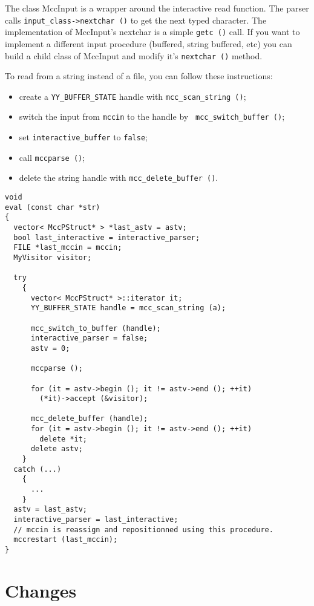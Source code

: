 \documentclass[11pt]{article}
\begin{document}
The class MccInput is a wrapper around the interactive read function.  The
parser calls {\tt input\_class->nextchar ()} to get the next typed
character.  The implementation of MccInput's nextchar is a simple {\tt getc
  ()} call.  If you want to implement a different input procedure (buffered,
string buffered, etc) you can build a child class of MccInput and modify
it's {\tt nextchar ()} method.

To read from a string instead of a file, you can follow these instructions:
\begin{itemize}
\item create a {\tt YY\_BUFFER\_STATE} handle with {\tt mcc\_scan\_string
    ()};
\item switch the input from {\tt mccin} to the handle by {\tt
    mcc\_switch\_buffer ()};
\item set {\tt interactive\_buffer} to {\tt false};
\item call {\tt mccparse ()};
\item delete the string handle with {\tt mcc\_delete\_buffer ()}.
\end{itemize}

\begin{verbatim}
void
eval (const char *str)
{
  vector< MccPStruct* > *last_astv = astv;
  bool last_interactive = interactive_parser;
  FILE *last_mccin = mccin;
  MyVisitor visitor;

  try
    {
      vector< MccPStruct* >::iterator it;
      YY_BUFFER_STATE handle = mcc_scan_string (a);
      
      mcc_switch_to_buffer (handle);
      interactive_parser = false;
      astv = 0;

      mccparse ();
      
      for (it = astv->begin (); it != astv->end (); ++it)
        (*it)->accept (&visitor);

      mcc_delete_buffer (handle);
      for (it = astv->begin (); it != astv->end (); ++it)
        delete *it;
      delete astv;
    }
  catch (...)
    {
      ...
    }
  astv = last_astv;
  interactive_parser = last_interactive;
  // mccin is reassign and repositionned using this procedure.
  mccrestart (last_mccin);
}
\end{verbatim}


\section{Changes}
\end{document}
